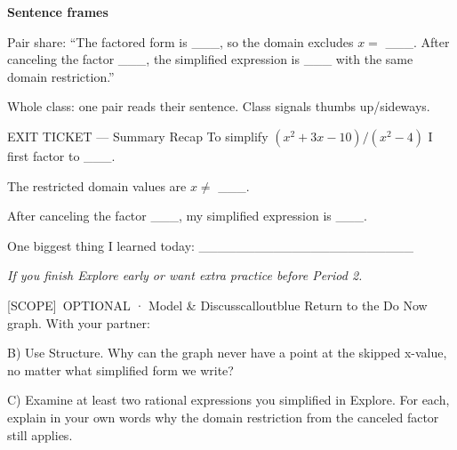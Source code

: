\documentclass[11pt]{article}
\newcommand{\IconScope}{[SCOPE]}
\begin{document}



\begin{sentenceframebox}
\textbf{Sentence frames}

Pair share: ``The factored form is \_\_\_, so the domain excludes \(x =\) \_\_\_. After canceling the factor \_\_\_, the simplified expression is \_\_\_ with the same domain restriction.''

Whole class: one pair reads their sentence. Class signals thumbs up/sideways.
\end{sentenceframebox}

\begin{summaryexitbox}{EXIT TICKET --- Summary Recap}
To simplify \((x^2+3x-10)/(x^2-4)\) I first factor to \_\_\_.

The restricted domain values are \(x \ne\) \_\_\_.

After canceling the factor \_\_\_, my simplified expression is \_\_\_.

One biggest thing I learned today: \_\_\_\_\_\_\_\_\_\_\_\_\_\_\_\_\_\_\_\_\_\_\_
\end{summaryexitbox}

\clearpage

\textit{If you finish Explore early or want extra practice before Period 2.}

\begin{callout}{\IconScope\ OPTIONAL · Model \& Discuss}{calloutblue}
Return to the Do Now graph. With your partner:

B) Use Structure. Why can the graph never have a point at the skipped x-value, no matter what simplified form we write?

C) Examine at least two rational expressions you simplified in Explore. For each, explain in your own words why the domain restriction from the canceled factor still applies.
\end{callout}

\end{document}
